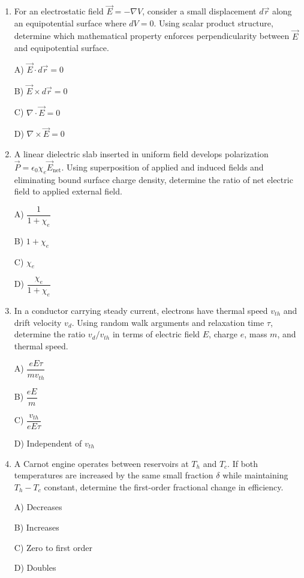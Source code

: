 \documentclass[12pt]{article}
\begin{document}
\begin{enumerate}[leftmargin=*]
\item For an electrostatic field $\vec E=-\nabla V$, consider a small displacement $d\vec r$ along an equipotential surface where $dV=0$. Using scalar product structure, determine which mathematical property enforces perpendicularity between $\vec E$ and equipotential surface.

A) $\vec E\cdot d\vec r=0$

B) $\vec E\times d\vec r=0$

C) $\nabla\cdot\vec E=0$

D) $\nabla\times\vec E=0$

\item A linear dielectric slab inserted in uniform field develops polarization $\vec P=\epsilon_0\chi_e\vec E_{\text{net}}$. Using superposition of applied and induced fields and eliminating bound surface charge density, determine the ratio of net electric field to applied external field.

A) $\dfrac{1}{1+\chi_e}$

B) $1+\chi_e$

C) $\chi_e$

D) $\dfrac{\chi_e}{1+\chi_e}$

\item In a conductor carrying steady current, electrons have thermal speed $v_{th}$ and drift velocity $v_d$. Using random walk arguments and relaxation time $\tau$, determine the ratio $v_d/v_{th}$ in terms of electric field $E$, charge $e$, mass $m$, and thermal speed.

A) $\dfrac{eE\tau}{mv_{th}}$

B) $\dfrac{eE}{m}$

C) $\dfrac{v_{th}}{eE\tau}$

D) Independent of $v_{th}$

\item A Carnot engine operates between reservoirs at $T_h$ and $T_c$. If both temperatures are increased by the same small fraction $\delta$ while maintaining $T_h-T_c$ constant, determine the first-order fractional change in efficiency.

A) Decreases

B) Increases

C) Zero to first order

D) Doubles

\end{enumerate}
\end{document}
